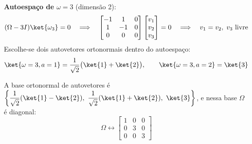 \textbf{Autoespaço de $\omega = 3$} (dimensão 2):
\[
    (\Omega - 3I)\ket{\omega_3} = 0 \quad \Longrightarrow \quad
    \begin{bmatrix} -1 & 1 & 0 \\ 1 & -1 & 0 \\ 0 & 0 & 0 \end{bmatrix}
    \begin{bmatrix} v_1 \\ v_2 \\ v_3 \end{bmatrix} = 0
    \quad \Longrightarrow \quad v_1 = v_2,\; v_3 \text{ livre}
\]
Escolhe-se dois autovetores ortonormais dentro do autoespaço:
\begin{equation}
    \ket{\omega=3, a=1} = \frac{1}{\sqrt{2}}\bigl(\ket{1}+\ket{2}\bigr), \qquad
    \ket{\omega=3, a=2} = \ket{3}
\end{equation}

A base ortonormal de autovetores é
$\left\{\dfrac{1}{\sqrt{2}}(\ket{1}-\ket{2}),\ \dfrac{1}{\sqrt{2}}(\ket{1}+\ket{2}),\ \ket{3}\right\}$,
e nessa base $\Omega$ é diagonal:
\begin{equation}
    \Omega \leftrightarrow \begin{bmatrix} 1 & 0 & 0 \\ 0 & 3 & 0 \\ 0 & 0 & 3 \end{bmatrix}
\end{equation}

